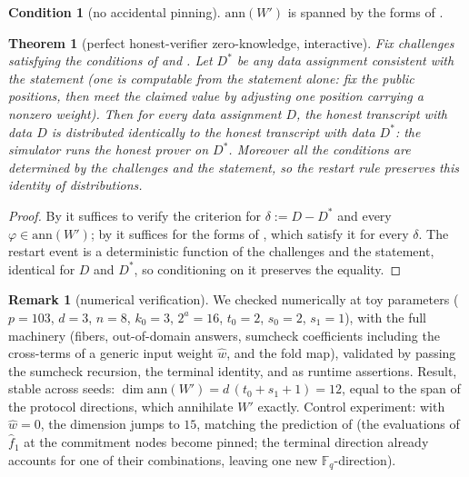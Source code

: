 \documentclass{article}
\newcommand{\Fq}{\mathbb{F}_q}
\newcommand{\extdeg}{d}
\newtheorem{theorem}{Theorem}
\theoremstyle{definition}
\newtheorem{remark}{Remark}
\newtheorem{condition}{Condition}
\begin{document}
\begin{condition}[no accidental pinning]\label{cond:pinning}
$\mathrm{ann}(W')$ is spanned by the forms of .
\end{condition}

\begin{theorem}[perfect honest-verifier zero-knowledge, interactive]\label{thm:simulator}
Fix challenges satisfying the conditions of  and . Let $D^*$ be any data assignment consistent with the statement (one is computable from the statement alone: fix the public positions, then meet the claimed value by adjusting one position carrying a nonzero weight). Then for every data assignment $D$, the honest transcript with data $D$ is distributed identically to the honest transcript with data $D^*$: the simulator runs the honest prover on $D^*$. Moreover all the conditions are determined by the challenges and the statement, so the restart rule preserves this identity of distributions.
\end{theorem}

\begin{proof}
By  it suffices to verify the criterion for $\delta := D - D^*$ and every $\varphi \in \mathrm{ann}(W')$; by  it suffices for the forms of , which satisfy it for every $\delta$. The restart event is a deterministic function of the challenges and the statement, identical for $D$ and $D^*$, so conditioning on it preserves the equality.
\end{proof}

\begin{remark}[numerical verification]
We checked  numerically at toy parameters ($p = 103$, $\extdeg = 3$, $n = 8$, $k_0 = 3$, $2^a = 16$, $t_0 = 2$, $s_0 = 2$, $s_1 = 1$), with the full machinery (fibers, out-of-domain answers, sumcheck coefficients including the cross-terms of a generic input weight $\hat{w}$, and the fold map), validated by passing the sumcheck recursion, the terminal identity, and  as runtime assertions. Result, stable across seeds: $\dim \mathrm{ann}(W') = \extdeg\,(t_0 + s_1 + 1) = 12$, equal to the span of the protocol directions, which annihilate $W'$ exactly. Control experiment: with $\hat{w} = 0$, the dimension jumps to $15$, matching the prediction of  (the evaluations of $\hat{f}_1$ at the commitment nodes become pinned; the terminal direction already accounts for one of their combinations, leaving one new $\Fq$-direction).
\end{remark}
\end{document}
